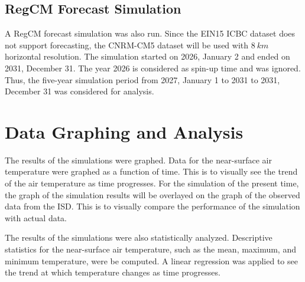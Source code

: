 	\subsection{RegCM Forecast Simulation}
		A RegCM forecast simulation was also run.
		Since the EIN15 ICBC dataset does not support forecasting,
		the CNRM-CM5 dataset will be used with $\qty{8}{km}$ horizontal resolution.
		The simulation started on 2026, January 2 and ended on 2031, December 31.
		The year 2026 is considered as spin-up time and was ignored.
		Thus, the five-year simulation period from 2027, January 1 to 2031 to 2031, December 31 was considered for analysis.
		
		
		
		
	
	
	
	

\section{Data Graphing and Analysis}
	The results of the simulations were graphed.
	Data for the near-surface air temperature were graphed as a function of time.
	This is to visually see the trend of the air temperature as time progresses.
	For the simulation of the present time, the graph of the simulation results will be overlayed on the graph of the observed data from the ISD.
	This is to visually compare the performance of the simulation with actual data.
	
	The results of the simulations were also statistically analyzed.
	Descriptive statistics for the near-surface air temperature, such as the mean, maximum, and minimum temperature, were be computed.
	A linear regression was applied to see the trend at which temperature changes as time progresses.